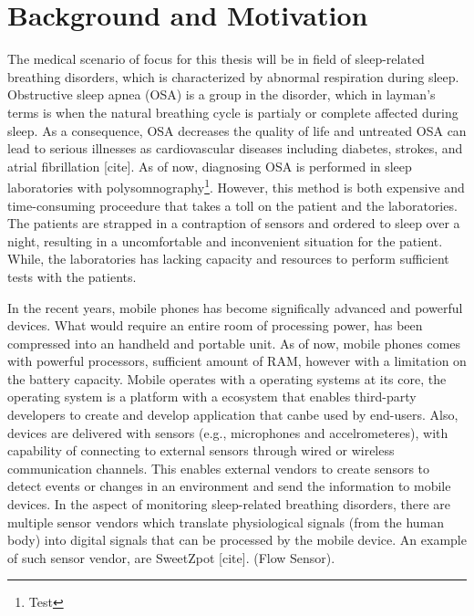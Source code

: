 \section{Background and Motivation}

The medical scenario of focus for this thesis will be in field of sleep-related breathing disorders, which is characterized by abnormal respiration during sleep. Obstructive sleep apnea (OSA) is a group in the disorder, which in layman's terms is when the natural breathing cycle is partialy or complete affected during sleep. As a consequence, OSA decreases the quality of life and untreated OSA can lead to serious illnesses as cardiovascular diseases including diabetes, strokes, and atrial fibrillation [cite]. As of now, diagnosing OSA is performed in sleep laboratories with polysomnography\footnote{Test}. However, this method is both expensive and time-consuming proceedure that takes a toll on the patient and the laboratories. The patients are strapped in a contraption of sensors and ordered to sleep over a night, resulting in a uncomfortable and inconvenient situation for the patient. While, the laboratories has lacking capacity and resources to perform sufficient tests with the patients.

In the recent years, mobile phones has become significally advanced and powerful devices. What would require an entire room of processing power, has been compressed into an handheld and portable unit. As of now, mobile phones comes with powerful processors, sufficient amount of RAM, however with a limitation on the battery capacity. Mobile operates with a operating systems at its core, the operating system is a platform with a ecosystem that enables third-party developers to create and develop application that canbe used by end-users. Also, devices are delivered with sensors (e.g., microphones and accelrometeres), with capability of connecting to external sensors through wired or wireless communication channels. This enables external vendors to create sensors to detect events or changes in an environment and send the information to mobile devices. In the aspect of monitoring sleep-related breathing disorders, there are multiple sensor vendors which translate physiological signals (from the human body) into digital signals that can be processed by the mobile device. An example of such sensor vendor, are SweetZpot [cite]. (Flow Sensor). 

